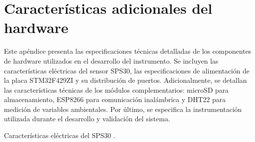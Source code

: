 
\chapter{Características adicionales del hardware} %

\label{AppendixA} %

Este apéndice presenta las especificaciones técnicas detalladas de los componentes de hardware utilizados en el desarrollo del instrumento. Se incluyen las características eléctricas del sensor SPS30, las especificaciones de alimentación de la placa STM32F429ZI y su distribución de puertos. Adicionalmente, se detallan las características técnicas de los módulos complementarios: microSD para almacenamiento, ESP8266 para comunicación inalámbrica y DHT22 para medición de variables ambientales. Por último, se especifica la instrumentación utilizada durante el desarrollo y validación del sistema.



\begin{table}[tph]
	\small
	\centering
	\caption{Características eléctricas del SPS30 \cite{Sensirion2023}.}
	\label{tab:electrical_characteristics}
	
\end{table}


\begin{table}[h]
	\small
	\centering
	\caption{Fuentes de alimentación externas del STM32F429ZI. %
	}
	\label{tab:external_power_sources}

\end{table}

